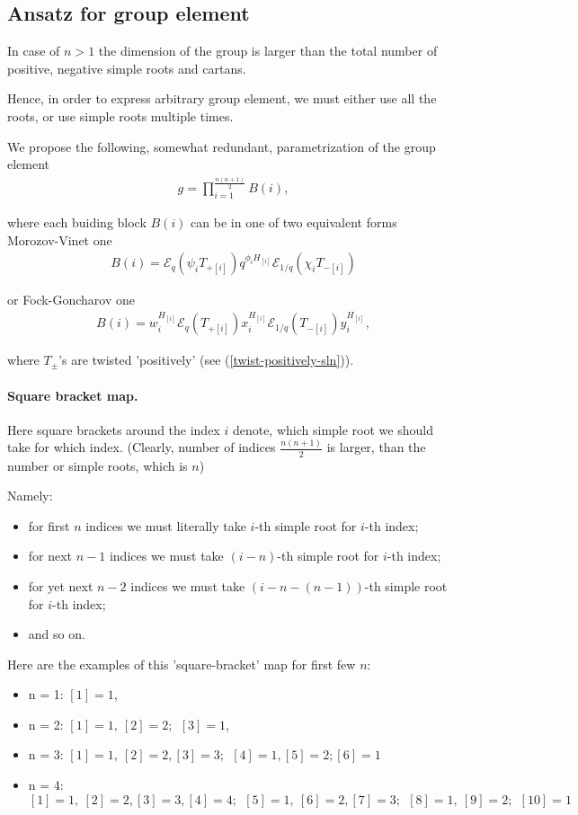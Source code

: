 \documentclass{article}
\newcommand{\lb}{\left (}
\newcommand{\rb}{\right )}
\newcommand{\B}[1]{\lb #1 \rb}
\newcommand{\lsb}{\left [}
\newcommand{\rsb}{\right ]}
\newcommand{\SB}[1]{\lsb #1 \rsb}
\newcommand{\be}{\begin{eqnarray}}
\newcommand{\ee}{\end{eqnarray}}
\newcommand {\?}{\textit{???}}
\newcommand{\me}[0]{\mathcal{E}}
\newcommand{\Tp}[1][]{T_{+ #1}}
\newcommand{\Tm}[1][]{T_{- #1}}
\newcommand{\delabel}[1]{(\ref{#1})}
\begin{document}
\subsection{Ansatz for group element}

In case of $n > 1$ the dimension of the group is larger than the total number of positive, negative
simple roots and cartans.

Hence, in order to express arbitrary group element, we must either use all the roots,
or use simple roots multiple times.

We propose the following, somewhat redundant, parametrization of the group element
\be
\label{quantum-group-element-sln}
g = \prod_{i = 1}^{\frac{n(n+1)}{2}}B(i),
\ee

where each buiding block $B(i)$ can be in one of two equivalent forms \\
Morozov-Vinet one
\be
\label{building-block-mv-sln}
B(i) = \me_q \B{\psi_i \Tp[\SB{i}]} q^{\phi_i H_{[i]}} \me_{1/q} \B{\chi_i \Tm[\SB{i}]}
\ee

or Fock-Goncharov one
\be
\label{building-block-sln-fg}
B(i) = w_i^{H_{[i]}} \me_q \B{\Tp[\SB{i}]} x_i^{H_{[i]}} \me_{1/q} \B{\Tm[\SB{i}]} y_i^{H_{[i]}},
\ee

where $T_\pm$'s are twisted 'positively' (see \delabel{twist-positively-sln}).

\paragraph{Square bracket map.} Here square brackets around the index $i$ denote, which simple root
we should take for which index. (Clearly, number of indices $\frac{n(n + 1)}{2}$ is larger, than the number
or simple roots, which is $n$)

Namely:
\begin{itemize}
  \item for first $n$ indices we must literally take $i$-th simple root for $i$-th index;
\item for next $n - 1$ indices we must take $(i - n)$-th simple root for $i$-th index;
  \item for yet next $n - 2$ indices we must take $(i - n - (n - 1))$-th simple root for $i$-th index;
\item and so on.
\end{itemize}

Here are the examples of this 'square-bracket' map for first few $n$:
\begin{itemize}
\item n = 1: $\SB{1} = 1$,
\item n = 2: $\SB{1} = 1,\ \SB{2} = 2;\ \
  \SB{3} = 1$,
\item n = 3: $\SB{1} = 1,\ \SB{2} = 2, \SB{3} = 3;\ \ 
  \SB{4} = 1, \SB{5} = 2;
  \SB{6} = 1$
\item n = 4: $\SB{1} = 1,\ \SB{2} = 2, \SB{3} = 3, \SB{4} = 4;\ \
  \SB{5} = 1,\ \SB{6} = 2, \SB{7} = 3;\ \
  \SB{8} = 1,\ \SB{9} = 2;\ \
  \SB{10} = 1$
\end{itemize}
\end{document}
